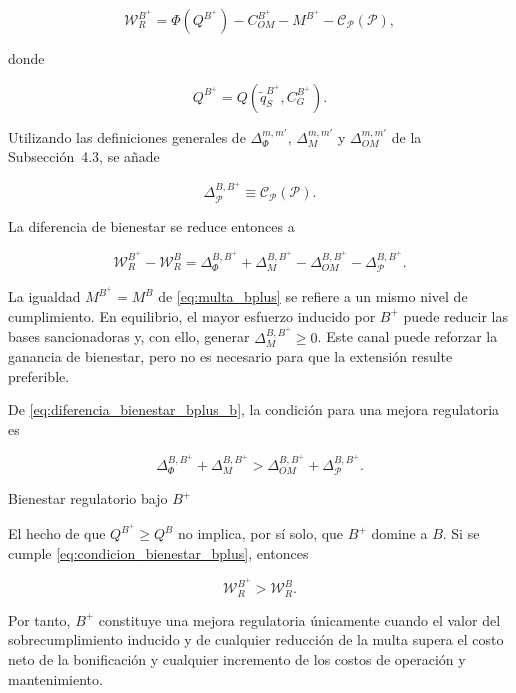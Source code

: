 \begin{equation}
\label{eq:bienestar_regulador_bplus}
\mathcal W_R^{B^{+}}
=
\Phi\!\left(
Q^{B^{+}}
\right)
-
C_{OM}^{B^{+}}
-
M^{B^{+}}
-
\mathcal C_{\mathcal P}(\mathcal P),
\end{equation}

donde

\begin{equation}
Q^{B^{+}}
=
Q\!\left(
\widetilde q_S^{B^{+}},
C_G^{B^{+}}
\right).
\end{equation}

Utilizando las definiciones generales de \(\Delta_\Phi^{m,m'}\), \(\Delta_M^{m,m'}\) y \(\Delta_{OM}^{m,m'}\) de la Subsección~4.3, se añade

\begin{equation}
\label{eq:delta_p_bplus}
\Delta_{\mathcal P}^{B,B^{+}}
\equiv
\mathcal C_{\mathcal P}(\mathcal P).
\end{equation}

La diferencia de bienestar se reduce entonces a

\begin{equation}
\label{eq:diferencia_bienestar_bplus_b}
\mathcal W_R^{B^{+}}
-
\mathcal W_R^{B}
=
\Delta_{\Phi}^{B,B^{+}}
+
\Delta_M^{B,B^{+}}
-
\Delta_{OM}^{B,B^{+}}
-
\Delta_{\mathcal P}^{B,B^{+}}.
\end{equation}

La igualdad \(M^{B^{+}}=M^B\) de \eqref{eq:multa_bplus} se refiere a un mismo nivel de cumplimiento. En equilibrio, el mayor esfuerzo inducido por \(B^{+}\) puede reducir las bases sancionadoras y, con ello, generar \(\Delta_M^{B,B^{+}}\geq0\). Este canal puede reforzar la ganancia de bienestar, pero no es necesario para que la extensión resulte preferible.

De \eqref{eq:diferencia_bienestar_bplus_b}, la condición para una mejora regulatoria es

\begin{equation}
\label{eq:condicion_bienestar_bplus}
\Delta_{\Phi}^{B,B^{+}}
+
\Delta_M^{B,B^{+}}
>
\Delta_{OM}^{B,B^{+}}
+
\Delta_{\mathcal P}^{B,B^{+}}.
\end{equation}

\begin{resultadobox}
{Bienestar regulatorio bajo \(B^{+}\)}
\label{res:bienestar_bplus}

El hecho de que \(Q^{B^{+}}\geq Q^{B}\) no implica, por sí solo, que \(B^{+}\) domine a \(B\). Si se cumple \eqref{eq:condicion_bienestar_bplus}, entonces

\begin{equation}
\mathcal W_R^{B^{+}}
>
\mathcal W_R^{B}.
\end{equation}

Por tanto, \(B^{+}\) constituye una mejora regulatoria únicamente cuando el valor del sobrecumplimiento inducido y de cualquier reducción de la multa supera el costo neto de la bonificación y cualquier incremento de los costos de operación y mantenimiento.
\end{resultadobox}

